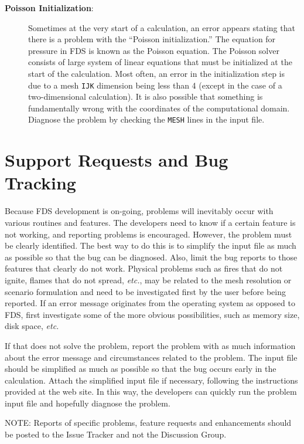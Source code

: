 \documentclass[11pt]{book}
\newcommand{\ct}{\tt\small}
\begin{document}
\begin{description}
\item[{\bf Poisson Initialization}:]
Sometimes at the very start of a calculation, an error
appears stating that there is a problem with the ``Poisson initialization.'' The equation for
pressure in FDS is known as the Poisson equation. The Poisson solver consists of large system
of linear equations that must be initialized at the start of the calculation.
Most often, an error in the initialization step is due to a mesh {\ct IJK} dimension
being less than 4 (except in the case of a two-dimensional calculation). It is also possible that something is
fundamentally wrong with the coordinates of the computational domain. Diagnose the problem by
checking the {\ct MESH} lines in the input file.
\end{description}


\section{Support Requests and Bug Tracking}

Because FDS development is on-going, problems will inevitably occur
with various routines and features. The developers need to know if a certain
feature is not working, and reporting problems is encouraged. However, the
problem must be clearly identified. The best way to do this is to simplify
the input file as much as possible so that the bug can be diagnosed.
Also, limit the bug reports to those features that clearly do not work.
Physical problems such as fires that do not ignite, flames that do not
spread, {\em etc.}, may be related to the mesh resolution or scenario
formulation and need to be investigated first by the user before being
reported. If an error message originates from the operating system as
opposed to FDS, first investigate some of the more obvious possibilities,
such as memory size, disk space, {\em etc.}

If that does not solve the problem, report the problem with as much information about the error message and
circumstances related to the problem. The input file should be simplified
as much as possible so that the bug occurs early in the calculation.
Attach the simplified input file if necessary, following the instructions provided at the web site.
In this way, the developers can quickly run the problem input file and hopefully diagnose the problem.

\begin{warning}
\noindent
NOTE: Reports of specific problems, feature requests and enhancements
should be posted to the Issue Tracker and not the Discussion Group.
\end{warning}
\end{document}
